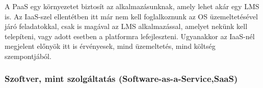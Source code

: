 A PaaS egy környezetet biztosít az alkalmazásunknak, amely lehet akár egy LMS is. Az IaaS-szel ellentétben itt már nem kell foglalkoznunk az OS üzemeltetésével járó feladatokkal, csak is magával az LMS alkalmazással, amelyet nekünk kell telepíteni, vagy adott esetben a platformra lefejleszteni. Ugyanakkor az IaaS-nél megjelent előnyök itt is érvényesek, mind üzemeltetés, mind költség szempontjából.


\subsubsection{Szoftver, mint szolgáltatás (\foreignlanguage{english}{Software-as-a-Service,SaaS})}

